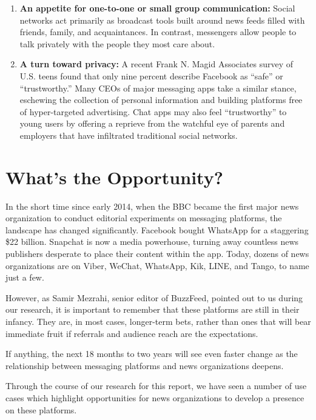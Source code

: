 \documentclass[notoc, symmetric, nobib, nols]{towcenter-guideto-book}
\begin{document}
\begin{enumerate}[itemsep=1em]
\item\textbf{An appetite for one-to-one or small group communication:} Social networks act primarily as broadcast tools built around news feeds filled with friends, family, and acquaintances. In contrast, messengers allow people to talk privately with the people they most care about. 

\item\textbf{A turn toward privacy:} A recent Frank N. Magid Associates survey of U.S. teens found that only nine percent describe Facebook as ``safe'' or ``trustworthy.''\autocite{MagidStudy} Many CEOs of major messaging apps take a similar stance, eschewing the collection of personal information and building platforms free of hyper-targeted advertising. Chat apps may also feel ``trustworthy'' to young users by offering a reprieve from the watchful eye of parents and employers that have infiltrated traditional social networks.
\end{enumerate}
 
\section{What's the Opportunity?}

In the short time since early 2014, when the BBC became the first major news organization to conduct editorial experiments on messaging platforms, the landscape has changed significantly. Facebook bought WhatsApp for a staggering \$22 billion. Snapchat is now a media powerhouse, turning away countless news publishers desperate to place their content within the app. Today, dozens of news organizations are on Viber, WeChat, WhatsApp, Kik, LINE, and Tango, to name just a few.

However, as Samir Mezrahi, senior editor of BuzzFeed, pointed out to us during our research, it is important to remember that these platforms are still in their infancy. They are, in most cases, longer-term bets, rather than ones that will bear immediate fruit if referrals and audience reach are the expectations. 

If anything, the next 18 months to two years will see even faster change as the relationship between messaging platforms and news organizations deepens. 

Through the course of our research for this report, we have seen a number of use cases which highlight opportunities for news organizations to develop a presence on these platforms.
\end{document}
